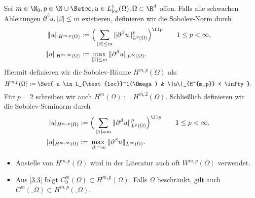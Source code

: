 
\begin{df} \label{3.4}
	Sei $m \in \N_0, p \in \N \cup \Set \infty, u \in L_{\text{loc}}^1(\Omega), \Omega\subset \R^d$ offen.
	Falls alle schwachen Ableitungen $\partial^\beta u, |\beta| \le m$ existieren, definieren wir die Sobolev-Norm durch
	\begin{align*}
		\|u\|_{H^{m,p}(\Omega)}
		&:= \Big( \sum_{|\beta| \le m} \|\partial^\beta u\|_{L^p(\Omega)}^p \Big)^{\f 1p} \qquad 1 \le p < \infty, \\
		\|u\|_{H^{m,\infty}(\Omega)}
		&:= \max_{|\beta|\le m} \|\partial^\beta u\|_{L^\infty(\Omega)}.
	\end{align*}
	Hiermit definieren wir die Sobolev-Räume $H^{m,p}(\Omega)$ als:
	\[
		H^{m,p}(\Omega)
		:= \Set{ u \in L_{\text{loc}}^1(\Omega) & \|u\|_{H^{m,p}} < \infty}.
	\]
	Für $p = 2$ schreiben wir auch $H^m(\Omega) := H^{m,2}(\Omega)$.
	Schließlich definieren wir die Sobolev-Seminorm durch
	\begin{align*}
		|u|_{H^{m,p}(\Omega)}
		&:= \Big( \sum_{|\beta| = m} \|\partial^\beta u\|_{L^p(\Omega)}^p \Big)^{\f 1p} \qquad 1 \le p < \infty, \\
		|u|_{H^{m,\infty}(\Omega)}
		&:= \max_{|\beta| = m} \|\partial^\beta u\|_{L^\infty(\Omega)}.
	\end{align*}
	\begin{note}
		\begin{itemize}
			\item
				Anstelle von $H^{m,p}(\Omega)$ wird in der Literatur auch oft $W^{m,p}(\Omega)$ verwendet.
			\item
				Aus \ref{3.3} folgt $C_0^m(\Omega) \subset H^{m,p}(\Omega)$.
				Falls $\Omega$ beschränkt, gilt auch $C^m(\_\Omega) \subset H^{m,p}(\_\Omega)$.
		\end{itemize}
	\end{note}
\end{df}

